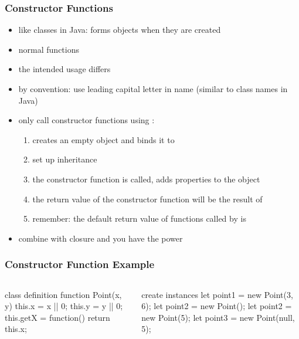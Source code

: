 \begin{frame}[fragile] \frametitle{Constructor Functions}

\begin{itemize}
  \item like classes in Java: forms objects when they are created
  \item normal functions
  \item the intended usage differs
  \item by convention: use leading capital letter in name (similar to class names in Java)
  \item only call constructor functions using :
  \begin{enumerate}
    \item creates an empty object and binds it to 
    \item set up inheritance
    \item the constructor function is called, adds properties to the object
    \item the return value of the constructor function will be the result of 
    \item remember: the default return value of functions called by  is 
  \end{enumerate}
  \item combine with closure and you have the power
\end{itemize}
\end{frame}

\begin{frame}[fragile] \frametitle{Constructor Function Example}

\begin{columns}[onlytextwidth]
  \begin{column}{0.5\textwidth}
\begin{CodeBox}{class definition}
function Point(x, y) {
  this.x = x || 0;
  this.y = y || 0;
  this.getX = function() {
    return this.x;
  }
}
\end{CodeBox}
  \end{column}
  \begin{column}{0.5\textwidth}
\begin{CodeBox}{create instances}
let point1 = new Point(3, 6);
let point2 = new Point();
let point2 = new Point(5);
let point3 = 
  new Point(null, 5);
\end{CodeBox}
  \end{column}
\end{columns}%
\end{frame}

